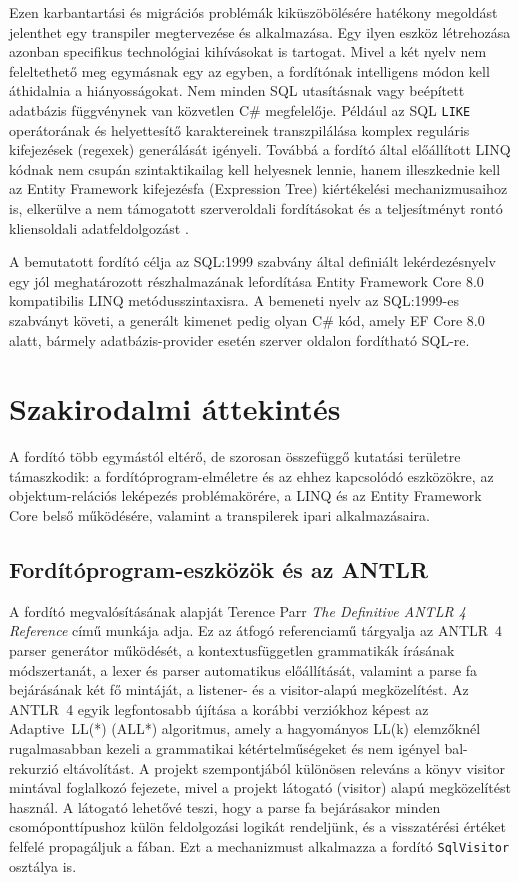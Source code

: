 \documentclass[a4paper,12pt]{article}
\begin{document}
Ezen karbantartási és migrációs problémák kiküszöbölésére hatékony megoldást jelenthet egy transpiler megtervezése és alkalmazása. Egy ilyen eszköz létrehozása azonban specifikus technológiai kihívásokat is tartogat. Mivel a két nyelv nem feleltethető meg egymásnak egy az egyben, a fordítónak intelligens módon kell áthidalnia a hiányosságokat. Nem minden SQL utasításnak vagy beépített adatbázis függvénynek van közvetlen C\# megfelelője. Például az SQL \texttt{LIKE} operátorának és helyettesítő karaktereinek transzpilálása komplex reguláris kifejezések (regexek) generálását igényeli. Továbbá a fordító által előállított LINQ kódnak nem csupán szintaktikailag kell helyesnek lennie, hanem illeszkednie kell az Entity Framework kifejezésfa (Expression Tree) kiértékelési mechanizmusaihoz is, elkerülve a nem támogatott szerveroldali fordításokat és a teljesítményt rontó kliensoldali adatfeldolgozást \cite{nmorph2023}.

A bemutatott fordító célja az SQL:1999 szabvány által definiált lekérdezésnyelv egy jól meghatározott részhalmazának lefordítása Entity Framework Core 8.0 kompatibilis LINQ metódusszintaxisra. A bemeneti nyelv az SQL:1999-es szabványt követi, a generált kimenet pedig olyan C\# kód, amely EF Core 8.0 alatt, bármely adatbázis-provider esetén szerver oldalon fordítható SQL-re.

\section{Szakirodalmi áttekintés}

A fordító több egymástól eltérő, de szorosan összefüggő kutatási területre támaszkodik: a fordítóprogram-elméletre és az ehhez kapcsolódó eszközökre, az objektum-relációs leképezés problémakörére, a LINQ és az Entity Framework Core belső működésére, valamint a transpilerek ipari alkalmazásaira.

\subsection{Fordítóprogram-eszközök és az ANTLR}

A fordító megvalósításának alapját Terence Parr \textit{The Definitive ANTLR 4 Reference} \cite{parr2013antlr4} című munkája adja. Ez az átfogó referenciamű tárgyalja az ANTLR~4 parser generátor működését, a kontextusfüggetlen grammatikák írásának módszertanát, a lexer és parser automatikus előállítását, valamint a parse fa bejárásának két fő mintáját, a listener- és a visitor-alapú megközelítést. Az ANTLR~4 egyik legfontosabb újítása a korábbi verziókhoz képest az Adaptive~LL(*) (ALL*) algoritmus, amely a hagyományos LL(k) elemzőknél rugalmasabban kezeli a grammatikai kétértelműségeket és nem igényel bal-rekurzió eltávolítást. A projekt szempontjából különösen releváns a könyv visitor mintával foglalkozó fejezete, mivel a projekt látogató (visitor) alapú megközelítést használ. A látogató lehetővé teszi, hogy a parse fa bejárásakor minden csomóponttípushoz külön feldolgozási logikát rendeljünk, és a visszatérési értéket felfelé propagáljuk a fában. Ezt a mechanizmust alkalmazza a fordító \texttt{SqlVisitor} osztálya is.
\end{document}
